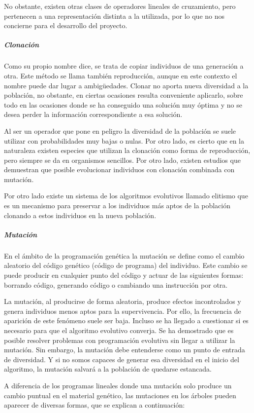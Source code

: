 No obstante, existen otras clases de operadores lineales de cruzamiento, pero pertenecen a una representación
distinta a la utilizada, por lo que no nos concierne para el desarrollo del proyecto. 

\subparagraph{Clonación}

Como su propio nombre dice, se trata de copiar individuos de una generación a otra. Este método se llama también
reproducción, aunque en este contexto el nombre puede dar lugar a ambigüedades. Clonar no aporta nueva
diversidad a la población, no obstante, en ciertas ocasiones resulta conveniente aplicarlo, sobre todo en las
ocasiones donde se ha conseguido una solución muy óptima y no se desea perder la información correspondiente a
esa solución.

Al ser un operador que pone en peligro la diversidad de la población se suele utilizar con probabilidades muy
bajas o nulas. Por otro lado, es cierto que en la naturaleza existen especies que utilizan la clonación como
forma de reproducción, pero siempre se da en organismos sencillos. Por otro lado, existen estudios que
demuestran que posible evolucionar individuos con clonación combinada con mutación.

Por otro lado existe un sistema de los algoritmos evolutivos llamado elitismo que es un mecanismo para preservar
a los individuos más aptos de la población clonando a estos individuos en la nueva población.


\subparagraph{Mutación}

En el ámbito de la programación genética la mutación se define como el cambio aleatorio del código genético
(código de programa) del individuo. Este cambio se puede producir en cualquier punto del código y actuar de las
siguientes formas: borrando código, generando código o cambiando una instrucción por otra.

La mutación, al producirse de forma aleatoria, produce efectos incontrolados y genera individuos menos aptos
para la supervivencia. Por ello, la frecuencia de aparición de este fenómeno suele ser baja. Incluso se ha
llegado a cuestionar si es necesario para que el algoritmo evolutivo converja. Se ha demostrado que es posible
resolver problemas con programación evolutiva sin llegar a utilizar la mutación. Sin embargo, la mutación debe
entenderse como un punto de entrada de diversidad. Y si no somos capaces de generar esa diversidad en el inicio
del algoritmo, la mutación salvará a la población de quedarse estancada.

A diferencia de los programas lineales donde una mutación solo produce un cambio puntual en el material
genético, las mutaciones en los árboles pueden aparecer de diversas formas, que se explican a continuación:

